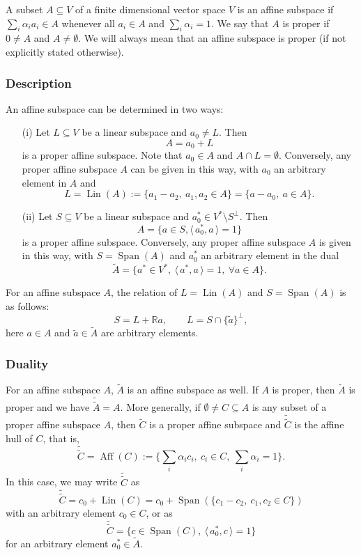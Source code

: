 \documentclass[12pt]{article}
\theoremstyle{definition}
\theoremstyle{remark}
\def\aff{\operatorname{Aff}}
\def\lin{\operatorname{Lin}}
\def\Span{\operatorname{Span}}
\def\<{\langle\,}
\def\>{\,\rangle}
\begin{document}
A subset $A\subseteq V$ of a finite dimensional vector space $V$ is an affine subspace if 
$\sum_i\alpha_i a_i\in A$ whenever all $a_i\in A$ and $\sum_i\alpha_i=1$. We say that $A$
is proper if $0\ne A$ and $A\ne \emptyset$. We will always
mean  that an affine subspace is proper (if not explicitly stated otherwise).

\subsubsection{Description}
An affine
subspace can be determined in two ways:
\begin{enumerate}
\item[(i)] Let $L\subseteq V$ be a linear subspace and $a_0\ne L$. Then 
\[
A=a_0+L
\]
is a proper affine subspace.  Note that $a_0\in A$ and $A\cap L=\emptyset$.
Conversely, any proper affine subspace $A$ can be given in this way, with $a_0$ an arbitrary element in $A$ and
\[
L=\lin(A):=\{a_1-a_2,\ a_1,a_2\in A\}=\{a-a_0,\ a\in A\}.
\]
\item[(ii)] Let $S\subseteq V$ be a linear subspace and $a_0^*\in V^*\setminus S^\perp$. Then
\[
A=\{a\in S, \<a_0^*,a\>=1\}
\]
is a proper affine subspace. Conversely, any proper affine subspace $A$ is given in this way, with
$S=\Span(A)$ and $a_0^*$ an arbitrary element in the dual 
\[
\tilde A=\{a^*\in V^*,\ \<a^*,a\>=1,\ \forall a\in A\}.
\]
\end{enumerate}

For an affine subspace $A$, the relation of $L=\lin(A)$ and $S=\Span(A)$ is as follows:
\[
S=L+\mathbb R a,\qquad L=S\cap \{\tilde a\}^\perp,
\]
here $a\in A$ and $\tilde a\in \tilde A$ are arbitrary elements.


\subsubsection{Duality}

For an affine subspace $A$,  $\tilde A$ is an affine subspace as well. If $A$ is proper,
then $\tilde A$ is proper and we have
$\tilde{\tilde A}=A$. More generally, if $\emptyset\ne C\subseteq A$ is any  subset of a
proper  affine
subspace $A$, then $\tilde C$ is a proper affine subspace 
and $\tilde{\tilde C}$ is the affine hull of $C$, that is,
\[
\tilde{\tilde C}=\aff(C):=\{\sum_i \alpha_i c_i,\ c_i\in C,\ \sum_i\alpha_i=1\}.
\]
In this case, we may write $\tilde{\tilde C}$ as
\[
\tilde{\tilde C}=c_0+\lin(C)=c_0+\Span(\{c_1-c_2,\ c_1,c_2\in C\})
\]
with an arbitrary element $c_0\in C$, or as
\[
\tilde{\tilde C}=\{c\in \Span(C),\ \<a_0^*,c\>=1\}
\]
for an arbitrary element $a_0^*\in \tilde A$.
\end{document}
